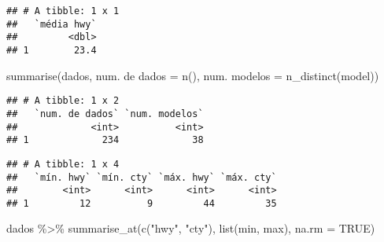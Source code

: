 \documentclass[
]{book}
\newenvironment{Shaded}{\begin{snugshade}}{\end{snugshade}}
\newcommand{\AttributeTok}[1]{\textcolor[rgb]{0.77,0.63,0.00}{#1}}
\newcommand{\CommentTok}[1]{\textcolor[rgb]{0.56,0.35,0.01}{\textit{#1}}}
\newcommand{\ConstantTok}[1]{\textcolor[rgb]{0.00,0.00,0.00}{#1}}
\newcommand{\FunctionTok}[1]{\textcolor[rgb]{0.00,0.00,0.00}{#1}}
\newcommand{\NormalTok}[1]{#1}
\newcommand{\OtherTok}[1]{\textcolor[rgb]{0.56,0.35,0.01}{#1}}
\newcommand{\SpecialCharTok}[1]{\textcolor[rgb]{0.00,0.00,0.00}{#1}}
\newcommand{\StringTok}[1]{\textcolor[rgb]{0.31,0.60,0.02}{#1}}
\begin{document}
\begin{verbatim}
## # A tibble: 1 x 1
##   `média hwy`
##         <dbl>
## 1        23.4
\end{verbatim}

\begin{Shaded}
\begin{Highlighting}[]
\FunctionTok{summarise}\NormalTok{(dados, }
          \StringTok{\textasciigrave{}}\AttributeTok{num. de dados}\StringTok{\textasciigrave{}} \OtherTok{=} \FunctionTok{n}\NormalTok{(),}
          \StringTok{\textasciigrave{}}\AttributeTok{num. modelos}\StringTok{\textasciigrave{}} \OtherTok{=} \FunctionTok{n\_distinct}\NormalTok{(model))}
\end{Highlighting}
\end{Shaded}

\begin{verbatim}
## # A tibble: 1 x 2
##   `num. de dados` `num. modelos`
##             <int>          <int>
## 1             234             38
\end{verbatim}

\begin{Shaded}
\end{Shaded}

\begin{verbatim}
## # A tibble: 1 x 4
##   `mín. hwy` `mín. cty` `máx. hwy` `máx. cty`
##        <int>      <int>      <int>      <int>
## 1         12          9         44         35
\end{verbatim}

\begin{Shaded}
\begin{Highlighting}[]
\NormalTok{dados }\SpecialCharTok{\%\textgreater{}\%}
  \FunctionTok{summarise\_at}\NormalTok{(}\FunctionTok{c}\NormalTok{(}\StringTok{"hwy"}\NormalTok{, }\StringTok{"cty"}\NormalTok{), }\FunctionTok{list}\NormalTok{(min, max), }\AttributeTok{na.rm =} \ConstantTok{TRUE}\NormalTok{)}
\end{Highlighting}
\end{Shaded}
\end{document}
